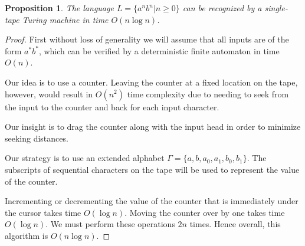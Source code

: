 \documentclass[11pt,letterpaper]{article}
\newtheorem{proposition}{Proposition}
\begin{document}
\begin{proposition}
    The language $L = \{ a^n b^n | n \geq 0\}$ can be recognized by a
    single-tape Turing machine in time $O(n \log n)$.
\end{proposition}

\begin{proof}
    First without loss of generality we will assume that all inputs are of the
    form $a^* b^*$, which can be verified by a deterministic finite automaton
    in time $O(n)$.

    Our idea is to use a counter. Leaving the counter at a fixed location on
    the tape, however, would result in $O(n^2)$ time complexity due to needing
    to seek from the input to the counter and back for each input character.

    Our insight is to drag the counter along with the input head in order to
    minimize seeking distances.

    Our strategy is to use an extended alphabet
    $\Gamma = \{a, b, a_0, a_1, b_0, b_1\}$.
    The subscripts of sequential characters on the tape will be used to
    represent the value of the counter.

    Incrementing or decrementing the value of the counter that is immediately
    under the cursor takes time $O(\log n)$. Moving the counter over by one
    takes time $O(\log n)$. We must perform these operations $2n$ times. Hence
    overall, this algorithm is $O(n \log n)$.
\end{proof}
\end{document}
